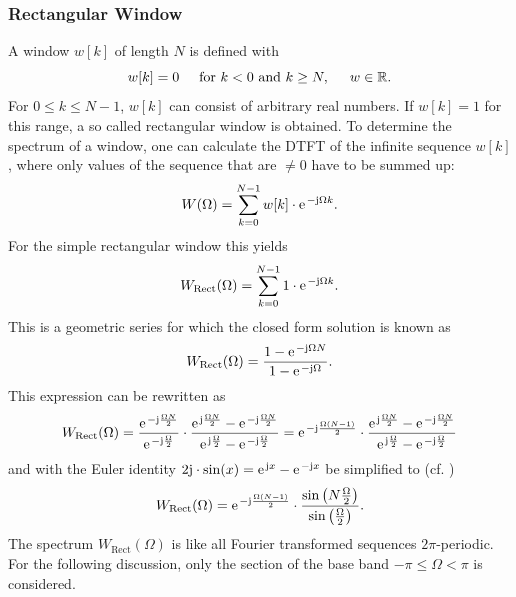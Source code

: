 \documentclass[11pt,a4paper,DIV=12]{scrartcl}
\begin{document}
\subsubsection{Rectangular Window}
A window $w[k]$ of length $N$ is defined with
%
\begin{equation}
w[k]=0 \hspace{5mm} \text{for}\,\,k<0\,\,\text{and}\,\,k\geq N,\hspace{5mm} w\in\mathbb{R}.
\end{equation}
%
For $0\leq k\leq N-1$, $w[k]$ can consist of arbitrary real numbers.
%
If $w[k]=1$ for this range, a so called rectangular window is obtained.
%
To determine the spectrum of a window, one can calculate the DTFT of the
infinite sequence $w[k]$, where only values of the sequence that are $\neq0$
have to be summed up:
%
\begin{equation}
W(\Omega)=\sum_{k=0}^{N-1}w[k]\cdot\e^{-\im\Omega k}.
\end{equation}
%
For the simple rectangular window this yields
%
\begin{equation}
W_\text{Rect}(\Omega)=\sum_{k=0}^{N-1}1\cdot\e^{-\im\Omega k}.
\label{eq:Ansatz_RectWin}
\end{equation}
%
This is a geometric series for which the closed form solution is known
\cite[(3-39)]{Lyons2011} as
%
\begin{equation}
W_\text{Rect}(\Omega)=\frac{1-\e^{-\im\Omega N}}{1-\e^{-\im\Omega}}.
\end{equation}
%
This expression can be rewritten as
%
\begin{equation}
W_\text{Rect}(\Omega)=\frac{\e^{-\im\frac{\Omega N}{2}}}{\e^{-\im\frac{\Omega}{2}}}\cdot\frac{\e^{\im\frac{\Omega N}{2}}-\e^{-\im\frac{\Omega N}{2}}}{\e^{\im\frac{\Omega}{2}}-\e^{-\im\frac{\Omega}{2}}}
=\e^{-\im\frac{\Omega(N-1)}{2}}\cdot\frac{\e^{\im\frac{\Omega N}{2}}-\e^{-\im\frac{\Omega N}{2}}}{\e^{\im\frac{\Omega}{2}}-\e^{-\im\frac{\Omega}{2}}}
\end{equation}
%
and with the Euler identity $2\im\cdot\sin(x)=\e^{\im x}-\e^{-\im x}$ be
simplified to (cf. \cite[(3-42)]{Lyons2011})
%
\begin{equation}
W_\mathrm{Rect}(\Omega)=\e^{-\im\frac{\Omega(N-1)}{2}}\cdot\frac{\sin\left(N\frac{\Omega}{2}\right)}{\sin\left(\frac{\Omega}{2}\right)}.
\label{eq:DTFT_RectWin}
\end{equation}
%
The spectrum $W_\text{Rect}(\Omega)$ is like all Fourier transformed sequences
$2\pi$-periodic.
%
For the following discussion, only the section of the base band
$-\pi\leq\Omega<\pi$ is considered.
\end{document}
